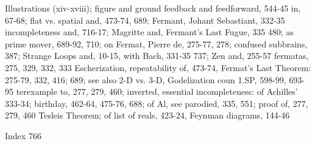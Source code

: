 Illustrations (xiv-xviii); figure and ground    feedback      and   feedforward,    544-45
in, 67-68; flat vs. spatial and, 473-74, 689;   Fermant, Johant Sebastiant, 332-35
incompleteness and, 716-17; Magritte and,       Fermant's Last Fugue, 335
480; as prime mover, 689-92, 710; on            Fermat, Pierre de, 275-77, 278; confused
subbrains, 387; Strange Loops and, 10-15,       with Bach, 331-35
737; Zen and, 255-57                            fermatas, 275, 329, 332, 333
Escherization, repeatability of, 473-74,        Fermat's Last Theorem: 275-79, 332, 416;
689; see also 2-D vs. 3-D, Godelization         coun
1.SP, 598-99, 693-95                            terexample to, 277, 279, 460; inverted,
essential incompleteness: of Achilles'          333-34;
birthday, 462-64, 475-76, 688; of Al, see       parodied, 335, 551; proof of, 277, 279, 460
Tesleis Theorem; of list of reals, 423-24,      Feynman diagrams, 144-46



Index                                                                                  766

